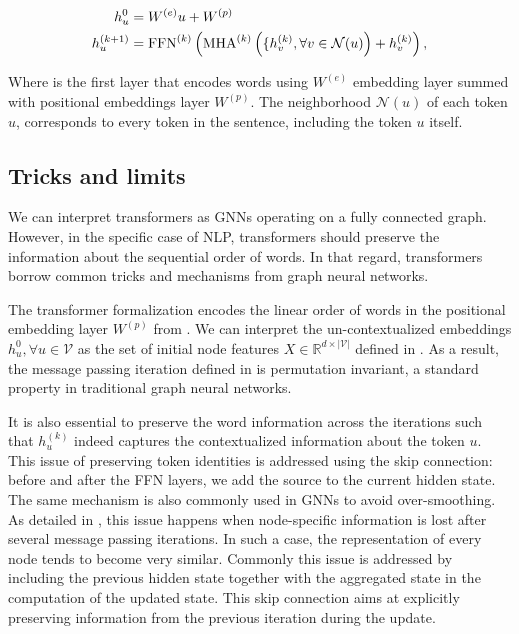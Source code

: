 {\small
\begin{align}
    h^0_u &= W^{(e)} u + W^{(p)} \labeq{update-aggregate-transformers-emb}\\
    h^{(k+1)}_u &= \text{FFN}^{(k)}\left(\text{MHA}^{(k)}\left(\{h_v^{(k)}, \forall v \in \mathcal{N}(u) \right) + h_v^{(k)}\right), \labeq{update-aggregate-transformers}
\end{align}}

Where  is the first layer that encodes words using $W^{(e)}$ embedding layer summed with positional embeddings layer $W^{(p)}$. The neighborhood $\mathcal{N}(u)$ of each token $u$, corresponds to every token in the sentence, including the token $u$ itself.

\subsection{Tricks and limits}

We can interpret transformers as GNNs operating on a fully connected graph. However, in the specific case of NLP, transformers should preserve the information about the sequential order of words. In that regard, transformers borrow common tricks and mechanisms from graph neural networks.

The transformer formalization encodes the linear order of words in the positional embedding layer $W^{(p)}$ from  . We can interpret the un-contextualized embeddings $h^0_u, \forall u \in \mathcal{V}$  as the set of initial node features $X \in \mathbb{R}^{d \times |\mathcal{V}|}$ defined in . As a result, the message passing iteration defined in  is permutation invariant, a standard property in traditional graph neural networks.

It is also essential to preserve the word information across the iterations such that $h^{(k)}_u$ indeed captures the contextualized information about the token $u$. This issue of preserving token identities is addressed using the skip connection: before and after the FFN layers, we add the source to the current hidden state. The same mechanism is also commonly used in GNNs to avoid over-smoothing. As detailed in \textcite{hamilton_2020}, this issue happens when node-specific information is lost after several message passing iterations. In such a case, the representation of every node tends to become very similar. Commonly this issue is addressed by including the previous hidden state together with the aggregated state in the computation of the updated state.
This skip connection aims at explicitly preserving information from the previous iteration during the update.


